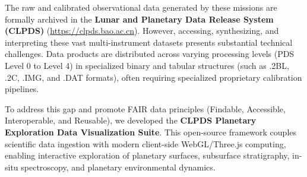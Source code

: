 The raw and calibrated observational data generated by these missions are formally archived in the \textbf{Lunar and Planetary Data Release System (CLPDS)} (\url{https://clpds.bao.ac.cn}). However, accessing, synthesizing, and interpreting these vast multi-instrument datasets presents substantial technical challenges. Data products are distributed across varying processing levels (PDS Level 0 to Level 4) in specialized binary and tabular structures (such as .2BL, .2C, .IMG, and .DAT formats), often requiring specialized proprietary calibration pipelines.

To address this gap and promote FAIR data principles (Findable, Accessible, Interoperable, and Reusable), we developed the \textbf{CLPDS Planetary Exploration Data Visualization Suite}. This open-source framework couples scientific data ingestion with modern client-side WebGL/Three.js computing, enabling interactive exploration of planetary surfaces, subsurface stratigraphy, in-situ spectroscopy, and planetary environmental dynamics.
